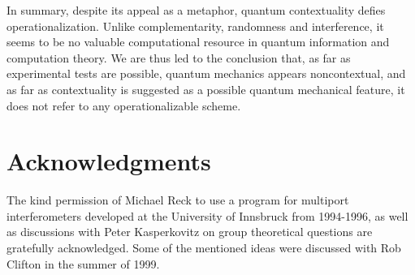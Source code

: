 \documentclass[prl,twocolumn,showpacs,showkeys,amsfonts]{revtex4}
\begin{document}
In summary,
despite its appeal as a metaphor, quantum contextuality defies operationalization.
Unlike complementarity, randomness and interference,
it seems to be no valuable computational resource in quantum information and computation theory.
We are thus led to the conclusion that,
as far as experimental tests are possible, quantum mechanics appears noncontextual,
and as far as contextuality is suggested as a possible quantum mechanical feature,
it does not refer to any operationalizable scheme.

\section*{Acknowledgments}
The kind permission of Michael Reck to
use a program for multiport interferometers
developed at the University of Innsbruck from 1994-1996, as well as
discussions with Peter Kasperkovitz on group theoretical questions
are gratefully acknowledged.
Some of the mentioned ideas were discussed with Rob Clifton in the summer of 1999.




%
%
\end{document}
